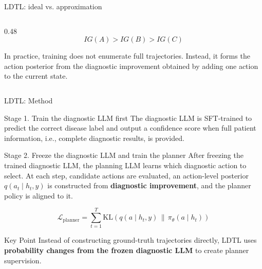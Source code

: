 \documentclass[
11pt,notheorems,hyperref={pdfauthor=whatever}
]{beamer}
\begin{document}
\begin{frame}[t]{LDTL: ideal vs. approximation}
\begin{columns}[T,onlytextwidth]
\begin{column}{0.48\textwidth}
\vspace{0.15em}
{\small
\[
IG(A)>IG(B)>IG(C)
\]
}

{\scriptsize In practice, training does not enumerate full trajectories. Instead, it forms the action posterior from the diagnostic improvement obtained by adding one action to the current state.}
\end{column}
\end{columns}
\end{frame}

\begin{frame}{LDTL: Method}
\vspace{0.05em}
\begin{block}{Stage 1. Train the diagnostic LLM first}
\small
The diagnostic LLM is SFT-trained to predict the correct disease label and output a confidence score when full patient information, i.e., complete diagnostic results, is provided.
\end{block}

\vspace{0.45em}
\begin{block}{Stage 2. Freeze the diagnostic LLM and train the planner}
\small
After freezing the trained diagnostic LLM, the planning LLM learns which diagnostic action to select. At each step, candidate actions are evaluated, an action-level posterior \(q(a_t\mid h_t,y)\) is constructed from \textbf{diagnostic improvement}, and the planner policy is aligned to it.
\end{block}

\vspace{0.35em}
\[
\mathcal{L}_{\mathrm{planner}}
=
\sum_{t=1}^{T}
\mathrm{KL}\!\left(q(a\mid h_t,y)\,\|\,\pi_\theta(a\mid h_t)\right)
\]

\vspace{0.15em}
\begin{block}{Key Point}
\small
Instead of constructing ground-truth trajectories directly, LDTL uses \textbf{probability changes from the frozen diagnostic LLM} to create planner supervision.
\end{block}
\end{frame}
\end{document}

